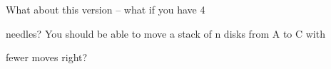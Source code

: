 What about this version -- what if you have 4

needles? You should be able to move a stack of n disks from A to C with

fewer moves right?


